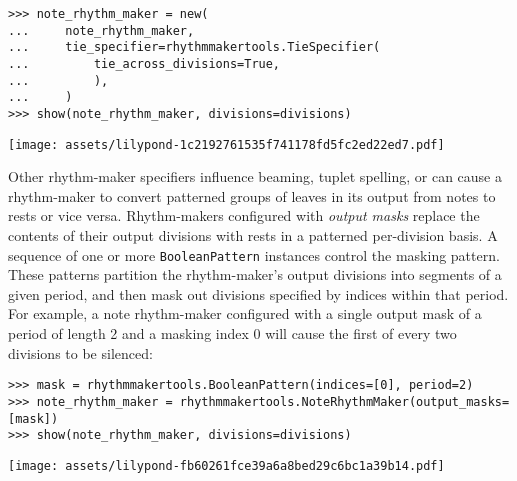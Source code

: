 \begin{abjadbookoutput}
\begin{singlespacing}
\vspace{-0.5\baselineskip}
\begin{lstlisting}
>>> note_rhythm_maker = new(
...     note_rhythm_maker,
...     tie_specifier=rhythmmakertools.TieSpecifier(
...         tie_across_divisions=True,
...         ),
...     )
>>> show(note_rhythm_maker, divisions=divisions)
\end{lstlisting}
\noindent\texttt{[image: assets/lilypond-1c2192761535f741178fd5fc2ed22ed7.pdf]}
\end{singlespacing}
\end{abjadbookoutput}

\noindent Other rhythm-maker specifiers influence beaming, tuplet spelling, or
can cause a rhythm-maker to convert patterned groups of leaves in its output
from notes to rests or vice versa. Rhythm-makers configured with \emph{output
masks} replace the contents of their output divisions with rests in a patterned
per-division basis. A sequence of one or more \texttt{BooleanPattern} instances
control the masking pattern. These patterns partition the rhythm-maker's output
divisions into segments of a given period, and then mask out divisions
specified by indices within that period. For example, a note rhythm-maker
configured with a single output mask of a period of length 2 and a masking
index 0 will cause the first of every two divisions to be silenced:

\begin{comment}
<abjad>
mask = rhythmmakertools.BooleanPattern(indices=[0], period=2)
note_rhythm_maker = rhythmmakertools.NoteRhythmMaker(output_masks=[mask])
show(note_rhythm_maker, divisions=divisions)
</abjad>
\end{comment}

\begin{abjadbookoutput}
\begin{singlespacing}
\vspace{-0.5\baselineskip}
\begin{lstlisting}
>>> mask = rhythmmakertools.BooleanPattern(indices=[0], period=2)
>>> note_rhythm_maker = rhythmmakertools.NoteRhythmMaker(output_masks=[mask])
>>> show(note_rhythm_maker, divisions=divisions)
\end{lstlisting}
\noindent\texttt{[image: assets/lilypond-fb60261fce39a6a8bed29c6bc1a39b14.pdf]}
\end{singlespacing}
\end{abjadbookoutput}

